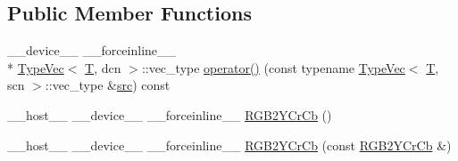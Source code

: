 \subsection*{Public Member Functions}
\begin{DoxyCompactItemize}
\item 
\-\_\-\-\_\-device\-\_\-\-\_\- \-\_\-\-\_\-forceinline\-\_\-\-\_\- \\*
\hyperlink{structcv_1_1gpu_1_1device_1_1TypeVec}{Type\-Vec}$<$ \hyperlink{calib3d_8hpp_a3efb9551a871ddd0463079a808916717}{T}, dcn $>$\-::vec\-\_\-type \hyperlink{structcv_1_1gpu_1_1device_1_1color__detail_1_1RGB2YCrCb_adc1ae15df94c7c4f7942783e2b2a0249}{operator()} (const typename \hyperlink{structcv_1_1gpu_1_1device_1_1TypeVec}{Type\-Vec}$<$ \hyperlink{calib3d_8hpp_a3efb9551a871ddd0463079a808916717}{T}, scn $>$\-::vec\-\_\-type \&\hyperlink{legacy_8hpp_a371cd109b74033bc4366f584edd3dacc}{src}) const 
\item 
\-\_\-\-\_\-host\-\_\-\-\_\- \-\_\-\-\_\-device\-\_\-\-\_\- \-\_\-\-\_\-forceinline\-\_\-\-\_\- \hyperlink{structcv_1_1gpu_1_1device_1_1color__detail_1_1RGB2YCrCb_a412844583904e375c2e8136669171252}{R\-G\-B2\-Y\-Cr\-Cb} ()
\item 
\-\_\-\-\_\-host\-\_\-\-\_\- \-\_\-\-\_\-device\-\_\-\-\_\- \-\_\-\-\_\-forceinline\-\_\-\-\_\- \hyperlink{structcv_1_1gpu_1_1device_1_1color__detail_1_1RGB2YCrCb_af3d0d882c517abd32d815abbc7b10788}{R\-G\-B2\-Y\-Cr\-Cb} (const \hyperlink{structcv_1_1gpu_1_1device_1_1color__detail_1_1RGB2YCrCb}{R\-G\-B2\-Y\-Cr\-Cb} \&)
\end{DoxyCompactItemize}


